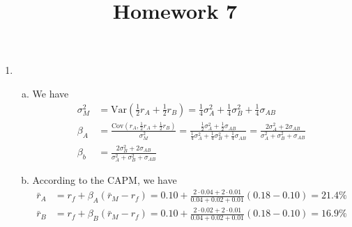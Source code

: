 \documentclass{article}
\newcommand{\var}{\mathrm{Var}}
\newcommand{\cov}{\mathrm{Cov}}
\begin{document}
\title{Homework 7}
\maketitle
\thispagestyle{fancy}

\begin{enumerate}
	\item 
		\begin{enumerate}[(a)]
			\item 
				\begin{soln}
					We have
					\begin{align*}
						\sigma_M^2 &= \var\left( \frac{1}{2} r_A + \frac{1}{2} r_B \right) = \frac{1}{4} \sigma_A^2 + \frac{1}{4} \sigma_B^2 + \frac{1}{4} \sigma_{AB} \\
						\beta_A &= \frac{\cov\left( r_A, \frac{1}{2} r_A + \frac{1}{2} r_B \right)}{\sigma_M^2} = \frac{\frac{1}{2}\sigma_A^2 + \frac{1}{2} \sigma_{AB}}{\frac{1}{4} \sigma_A^2 + \frac{1}{4}\sigma_B^2 + \frac{1}{4}\sigma_{AB}} = \frac{2\sigma_A^2 + 2\sigma_{AB}}{\sigma_A^2+\sigma_B^2+\sigma_{AB}} \\
						\beta_b &= \frac{2\sigma_B^2 + 2\sigma_{AB}}{\sigma_A^2+\sigma_B^2+\sigma_{AB}}
					\end{align*}
				\end{soln}

			\item 
				\begin{soln}
					According to the CAPM, we have
					\begin{align*}
						\bar r_A &= r_f + \beta_A(\bar r_M - r_f) = 0.10 + \frac{2\cdot 0.04 + 2\cdot 0.01}{0.04+0.02+0.01} (0.18-0.10) = 21.4\% \\
						\bar r_B &= r_f + \beta_B(\bar r_M-r_f) = 0.10 + \frac{2\cdot 0.02 + 2\cdot 0.01}{0.04+0.02+0.01}(0.18-0.10) = 16.9\%
					\end{align*}
				\end{soln}

		\end{enumerate}


\end{enumerate}
\end{document}
